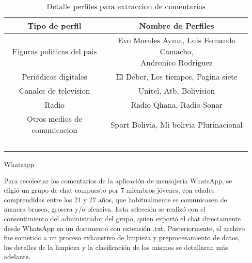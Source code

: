 \begin{table}[!ht]
	\centering
	\begin{tabular}{|c|c|}
		\hline
		\textbf{Tipo de perfil} & \textbf{Nombre de Perfiles} \\ \hline
		Figuras politicas del pais  & \makecell{Evo Morales Ayma, Luis Fernando Camacho, \\  Andronico Rodriguez} \\ \hline
		Periódicos digitales                       & El Deber, Los tiempos, Pagina siete \\ \hline
		Canales de television & Unitel, Atb, Bolivision \\ \hline
		Radio  & Radio Qhana, Radio Sonar \\ \hline
		Otros medios de comunicacion & Sport Bolivia, Mi bolivia Plurinacional \\ \hline
		~ & ~ \\ \hline
	\end{tabular}
	\caption{Detalle perfiles para extraccion de comentarios}
	\label{tbl:16}
\end{table}

Whatsapp


Para recolectar los comentarios de la aplicación de mensajería WhatsApp, se eligió un grupo de chat compuesto por 7 miembros jóvenes, con edades comprendidas entre los 21 y 27 años, que habitualmente se comunicasen de manera brusca, grosera y/o ofensiva. Esta selección se realizó con el consentimiento del administrador del grupo, quien exportó el chat directamente desde WhatsApp en un documento con extensión .txt. Posteriormente, el archivo fue sometido a un proceso exhaustivo de limpieza y preprocesamiento de datos, los detalles de la limpieza y la clasificación de los mismos se detallaran más  adelante.

